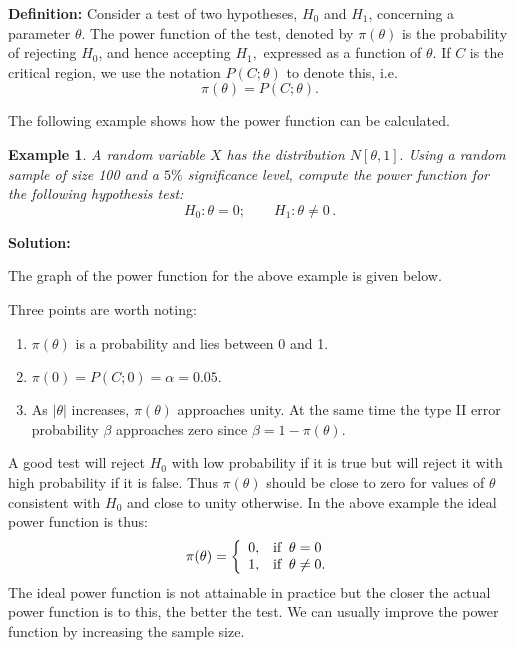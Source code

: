 \documentclass[12pt]{article}
\newtheorem{example}[theorem]{Example}
\begin{document}
\textbf{Definition:} Consider a test of two hypotheses, $H_{0}$ and $H_{1}$, concerning a parameter $\theta.$ The power function of the test, denoted by $\pi(\theta)$ is the probability of rejecting $H_{0}$, and hence accepting $H_{1},$ expressed as a function of $\theta.$ If $C$ is the critical region, we use the notation $P(C;\theta)$ to denote this, i.e. $$\pi(\theta)=P(C;\theta).$$

The following example shows how the power function can be calculated.

\begin{example}
A random variable $X$ has the distribution $N[\theta,1].$ Using a random sample of size 100 and a $5\%$ significance level, compute the power function for the following hypothesis test:
$$
H_{0}: \theta=0; \qquad H_{1}: \theta \neq 0\,.
$$
\end{example}

\begin{mdframed}
\bf{Solution:}
\textcolor[rgb]{1.00,1.00,1.00}{\lipsum[1-6]}
\end{mdframed}

The graph of the power function for the above example is given below.


Three points are worth noting:
\begin{enumerate}
\item $\pi(\theta)$ is a probability and lies between 0 and 1.
\item $\pi(0)=P(C;0)=\alpha=0.05.$
\item As $|\theta|$ increases, $\pi(\theta)$ approaches unity. At the same time the type II error probability $\beta$ approaches zero since $\beta=1-\pi(\theta).$
\end{enumerate}

A good test will reject $H_{0}$ with low probability if it is true but will reject it with high probability if it is false. Thus $\pi(\theta)$ should be close to zero for values of $\theta$ consistent with $H_{0}$ and close to unity otherwise. In the above example the ideal power function is thus:
$$\pi(\theta)=\left\{
    \begin{array}{ll}
      0, & \hbox{if}\;\; \theta=0 \\
      1, & \hbox{if}\;\; \theta\neq 0.
    \end{array}
  \right.
$$
The ideal power function is not attainable in practice but the closer the actual power function is to this, the better the test. We can usually improve the power function by increasing the sample size.
\end{document}

